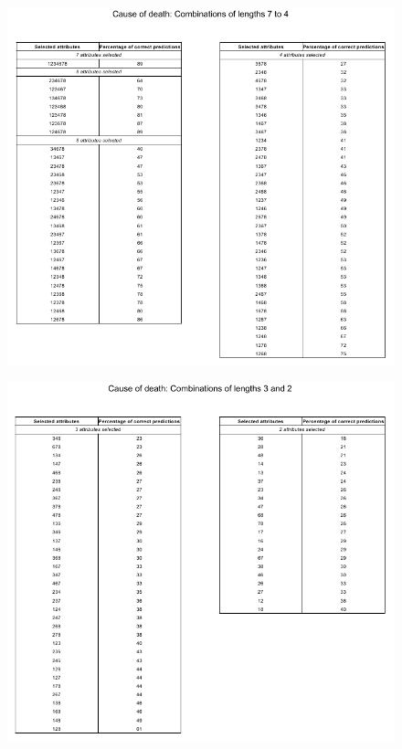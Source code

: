 \documentclass{mproj}
\begin{document}
\begin{figure}[h]
	\centering
	\includegraphics[width=\textwidth]{images/weapon_results1}
\end{figure}

\begin{figure}[h]
	\centering	
	\includegraphics[width=\textwidth]{images/weapon_results2}
\end{figure}
\end{document}
